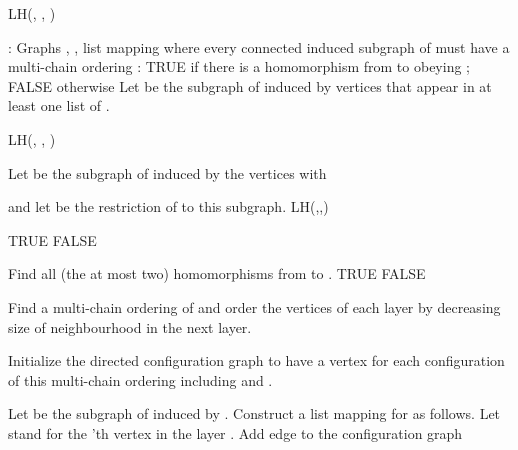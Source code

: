 \documentclass[12pt]{llncs}
\begin{document}
\begin{algorithm}
\caption{LH(, , )}
\begin{algorithmic}

\smallskip

: Graphs , , list mapping  where every connected
induced subgraph of  must have a multi-chain ordering
: TRUE if there is a homomorphism from  to  obeying
; FALSE otherwise
\smallskip
\State Let  be the subgraph of  induced by vertices that appear in at
least one list of .

\If {}
  \Return LH(, , )
\EndIf

  \State Let  be the subgraph of  induced by the vertices  with
  
  \State \hspace{\algorithmicindent}  and let  be the restriction of 
  to this subgraph.
  \Return LH(,,)
\EndIf

    \Return TRUE
  \Else
    \Return FALSE
  \EndIf
\EndIf


      \State Find all (the at most two) homomorphisms from  to .
            \State  TRUE
        \Else
                 \State  FALSE
        \EndIf

    \Else
        \State Find a multi-chain ordering  of 
        and order the vertices of 
        \State \hspace{\algorithmicindent} each layer by decreasing size of
        neighbourhood in the next layer.
        
        \State Initialize the directed configuration graph to have a vertex
        for each 
        \State \hspace{\algorithmicindent} configuration of this multi-chain ordering including 
        and .

        \State Let  be the subgraph of  induced by .
                \State Construct a list mapping  for  as follows.
                  \State Let  stand for the 'th
                vertex in the layer .
                  \State 
                                \State \hspace{\algorithmicindent}  
                \EndFor
                      \State Add edge  to the
                      configuration graph
                \EndIf
             \EndFor
        \EndFor
  \end{algorithmic}
\end{algorithm}
\clearpage
\end{document}
